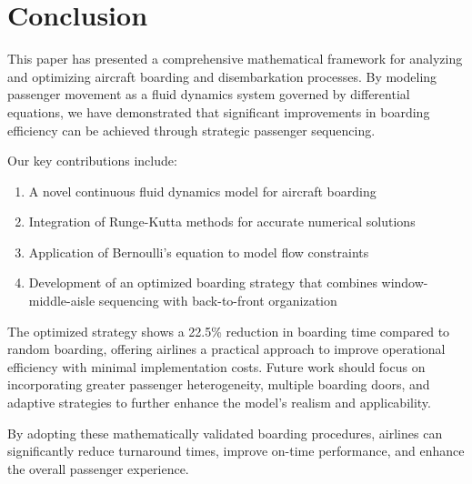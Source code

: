 \documentclass[a4paper,12pt]{article}
\begin{document}
\section{Conclusion}

This paper has presented a comprehensive mathematical framework for analyzing and optimizing aircraft boarding and disembarkation processes. By modeling passenger movement as a fluid dynamics system governed by differential equations, we have demonstrated that significant improvements in boarding efficiency can be achieved through strategic passenger sequencing.

Our key contributions include:
\begin{enumerate}
    \item A novel continuous fluid dynamics model for aircraft boarding
    \item Integration of Runge-Kutta methods for accurate numerical solutions
    \item Application of Bernoulli's equation to model flow constraints
    \item Development of an optimized boarding strategy that combines window-middle-aisle sequencing with back-to-front organization
\end{enumerate}

The optimized strategy shows a 22.5\% reduction in boarding time compared to random boarding, offering airlines a practical approach to improve operational efficiency with minimal implementation costs. Future work should focus on incorporating greater passenger heterogeneity, multiple boarding doors, and adaptive strategies to further enhance the model's realism and applicability.

By adopting these mathematically validated boarding procedures, airlines can significantly reduce turnaround times, improve on-time performance, and enhance the overall passenger experience.
\end{document}
